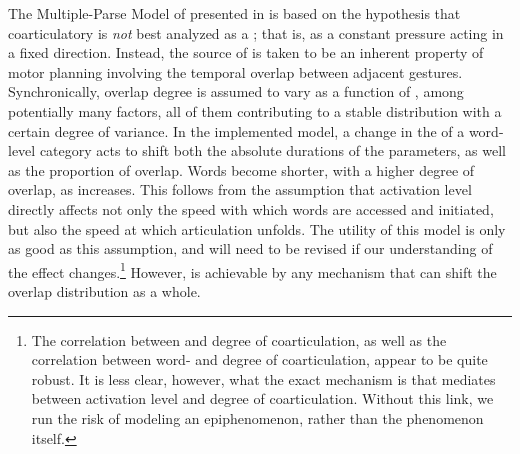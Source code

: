 The Multiple-Parse Model of  presented in  is based on the hypothesis that coarticulatory 
is \emph{not} best analyzed as a  ; that is, as a constant
pressure acting in a fixed direction. Instead, the source of 
is taken to be an inherent property of motor planning involving the
temporal overlap between adjacent  gestures. Synchronically,
overlap degree is assumed to vary as a function of ,
among potentially many factors, all of them contributing to a stable
distribution with a certain degree of variance. In the implemented
model, a change in the  of a word-level category
acts to shift both the absolute durations of the  parameters,
as well as the proportion of overlap. Words become shorter, with a
higher degree of overlap, as  increases. This follows
from the assumption that activation level directly affects not only
the speed with which words are accessed and initiated, but also the
speed at which articulation unfolds. The utility of this model is
only as good as this assumption, and will need to be revised if our
understanding of the  effect changes.\footnote{The correlation between  and degree of coarticulation,
as well as the correlation between word- and degree of coarticulation,
appear to be quite robust. It is less clear, however, what the exact
mechanism is that mediates between activation level and degree of
coarticulation. Without this link, we run the risk of modeling an
epiphenomenon, rather than the phenomenon itself.} However,  is achievable by any mechanism that can shift
the overlap distribution as a whole.

